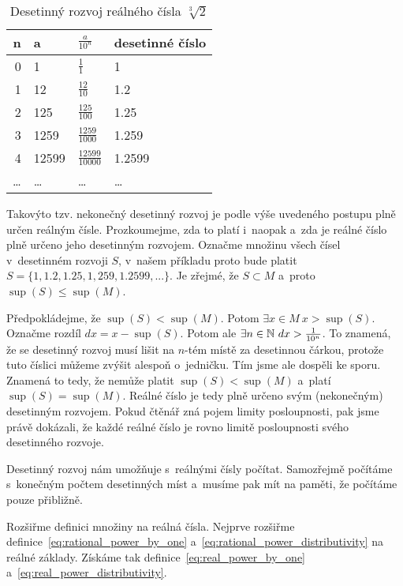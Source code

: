 \begin{table}[ht]
\centering
\begin{tabular}{|r|l|l|l|}
\hline
n & a & \(\frac{a}{10^n}\) & desetinné číslo\\
\hline
0 & 1 & \(\frac{1}{1}\) & 1 \\
1 & 12 & \(\frac{12}{10}\) & 1.2 \\
2 & 125 & \(\frac{125}{100}\) & 1.25 \\
3 & 1259 & \(\frac{1259}{1000}\) & 1.259 \\
4 & 12599 & \(\frac{12599}{10000}\) & 1.2599 \\
\ldots & \ldots & \ldots & \ldots \\
\hline
\end{tabular}
\caption{Desetinný rozvoj reálného čísla \(\sqrt[3]{2}\)}
\label{tab:real_decimal}
\end{table}

Takovýto tzv. nekonečný desetinný rozvoj je podle výše uvedeného postupu plně určen reálným čísle. Prozkoumejme, zda to platí i~naopak a~zda je reálné číslo plně určeno jeho desetinným rozvojem. Označme množinu všech čísel v~desetinném rozvoji \(S\), v~našem příkladu proto bude platit \(S = \{1, 1.2, 1.25, 1,259, 1.2599, ...\}\). Je zřejmé, že \(S \subset M\) a~proto \(\sup(S) \leq \sup(M)\).

Předpokládejme, že \(\sup(S) < \sup(M)\). Potom \(\exists x \in M \ x > \sup(S)\). Označme rozdíl \(dx = x - \sup(S)\). Potom ale \(\exists n \in \mathbb{N} \ dx > \frac{1}{10^n}\). To znamená, že se desetinný rozvoj musí lišit na \(n\)-tém místě za desetinnou čárkou, protože tuto číslici můžeme zvýšit alespoň o~jedničku. Tím jsme ale dospěli ke sporu. Znamená to tedy, že nemůže platit \(\sup(S) < \sup(M)\) a~platí \(\sup(S) = \sup(M)\). Reálné číslo je tedy plně určeno svým (nekonečným) desetinným rozvojem. Pokud čtěnář zná pojem limity posloupnosti, pak jsme právě dokázali, že každé reálné číslo je rovno limitě posloupnosti svého desetinného rozvoje. 

Desetinný rozvoj nám umožňuje s~reálnými čísly počítat. Samozřejmě počítáme s~konečným počtem desetinných míst a~musíme pak mít na paměti, že počítáme pouze přibližně.

Rozšiřme definici množiny na reálná čísla. Nejprve rozšiřme definice~\eqref{eq:rational_power_by_one} a~\eqref{eq:rational_power_distributivity} na reálné základy. Získáme tak definice~\eqref{eq:real_power_by_one} a~\eqref{eq:real_power_distributivity}.

